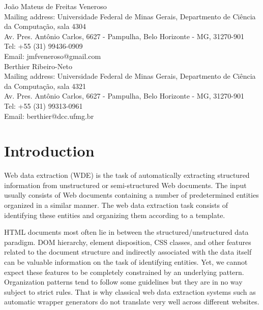 \documentclass{nle}
\begin{document}
\maketitle

João Mateus de Freitas Veneroso \\
Mailing address: Universidade Federal de Minas Gerais, Departmento de Ciência da Computação, sala 4304\\
Av. Pres. Antônio Carlos, 6627 - Pampulha, Belo Horizonte - MG, 31270-901 \\
Tel: +55 (31) 99436-0909 \\
Email: jmfveneroso@gmail.com \\

Berthier Ribeiro-Neto \\
Mailing address: Universidade Federal de Minas Gerais, Departmento de Ciência da Computação, sala 4321\\
Av. Pres. Antônio Carlos, 6627 - Pampulha, Belo Horizonte - MG, 31270-901 \\
Tel: +55 (31) 99313-0961 \\
Email: berthier@dcc.ufmg.br \\


\section{Introduction}

Web data extraction (WDE) is the task of automatically extracting structured 
information from unstructured or semi-structured Web documents. The input 
usually consists of Web documents containing a number of predetermined entities 
organized in a similar manner. The web data extraction task consists of 
identifying these entities and organizing them according to a template. 

HTML documents most often lie in between the structured/unstructured 
data paradigm. DOM hierarchy, element disposition, CSS classes, and other 
features related to the document structure and indirectly associated with the 
data itself can be valuable information on the task of identifying
entities. Yet, we cannot expect these features to be completely constrained 
by an underlying pattern. Organization patterns tend to follow some guidelines 
but they are in no way subject to strict rules. That is why classical web data 
extraction systems such as automatic wrapper generators 
\cite{Kushmerick2000,Hsu1998,Muslea1999}
do not translate very well across different websites. 
\end{document}
